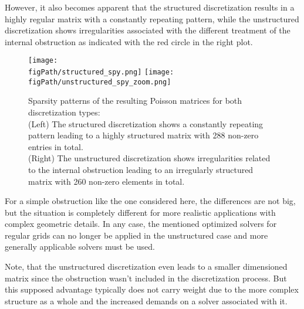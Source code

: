 However, it also becomes apparent that the structured discretization results in a highly regular matrix with a constantly repeating pattern, while the unstructured discretization shows irregularities associated with the different treatment of the internal obstruction as indicated with the red circle in the right plot. 

\begin{figure}[ht]
\begin{center}
\texttt{[image: \\figPath/structured\_spy.png]}\hspace{1.6cm}
\texttt{[image: \\figPath/unstructured\_spy\_zoom.png]}
\end{center}
\caption[Structured versus unstructured sparsity pattern]{Sparsity patterns of the resulting Poisson matrices for both discretization types:\\
(Left) The structured discretization shows a constantly repeating pattern leading to a highly structured matrix with 288 non-zero entries in total. \\
(Right) The unstructured discretization shows irregularities related to the internal obstruction leading to an irregularly structured matrix with 260 non-zero elements in total.}
\label{FIG_structured_vs_unstructured_spy}
\end{figure}

For a simple obstruction like the one considered here, the differences are not big, but the situation is completely different for more realistic applications with complex geometric details. In any case, the mentioned optimized solvers for regular grids can no longer be applied in the unstructured case and more generally applicable solvers must be used.

Note, that the unstructured discretization even leads to a smaller dimensioned matrix since the obstruction wasn't included in the discretization process. But this supposed advantage typically does not carry weight due to the more complex structure as a whole and the increased demands on a solver associated with it.


